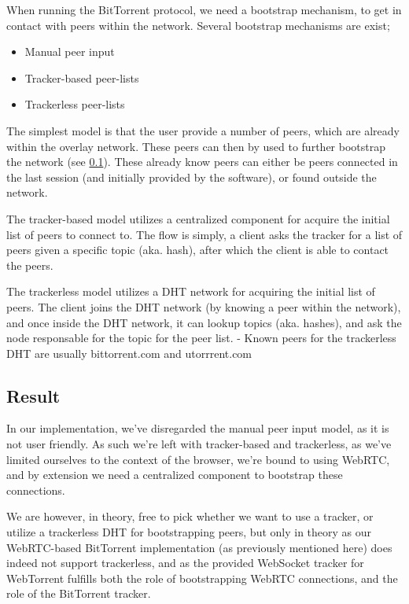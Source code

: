 
When running the BitTorrent protocol, we need a bootstrap mechanism, to get in
contact with peers within the network. Several bootstrap mechanisms are exist;
\begin{itemize}
\item Manual peer input
\item Tracker-based peer-lists
\item Trackerless peer-lists
\end{itemize}
The simplest model is that the user provide a number of peers, which are
already within the overlay network. These peers can then by used to further
bootstrap the network (see \ref{}). These already know peers can either be
peers connected in the last session (and initially provided by the software),
or found outside the network.

The tracker-based model utilizes a centralized component for acquire the
initial list of peers to connect to. The flow is simply, a client asks the
tracker for a list of peers given a specific topic (aka. hash), after which the
client is able to contact the peers.

The trackerless model utilizes a DHT network for acquiring the initial list of 
peers. The client joins the DHT network (by knowing a peer within the network),
and once inside the DHT network, it can lookup topics (aka. hashes), and ask
the node responsable for the topic for the peer list.
\newline
- Known peers for the trackerless DHT are usually bittorrent.com and utorrrent.com

\subsection{Result}
In our implementation, we've disregarded the manual peer input model, as it is
not user friendly. As such we're left with tracker-based and trackerless, as 
we've limited ourselves to the context of the browser, we're bound to using 
WebRTC, and by extension we need a centralized component to bootstrap these
connections. 

We are however, in theory, free to pick whether we want to use a tracker, or 
utilize a trackerless DHT for bootstrapping peers, but only in theory as our
WebRTC-based BitTorrent implementation (as previously mentioned here) does
indeed not support trackerless, and as the provided WebSocket tracker for 
WebTorrent fulfills both the role of bootstrapping WebRTC connections, and the
role of the BitTorrent tracker.

